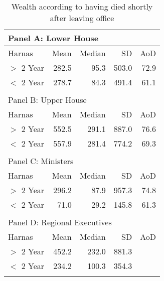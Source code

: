 \begin{table}[ht]
\centering
\begin{tabular}{lrrrr}
   
\multicolumn{5}{l}{Panel A: Lower House}\\ 
\hline
Harnas & Mean & Median & SD & AoD \\\hline

$>$ 2 Year & 282.5 & 95.3 & 503.0 & 72.9 \\ 
  $<$ 2 Year & 278.7 & 84.3 & 491.4 & 61.1 \\ 
   \hline\\ 
\multicolumn{5}{l}{Panel B: Upper House}\\ 
\hline
Harnas & Mean & Median & SD & AoD \\\hline
$>$ 2 Year & 552.5 & 291.1 & 887.0 & 76.6 \\ 
  $<$ 2 Year & 557.9 & 281.4 & 774.2 & 69.3 \\ 
   \hline\\ 
\multicolumn{5}{l}{Panel C: Ministers}\\ 
\hline
Harnas & Mean & Median & SD & AoD \\\hline
$>$ 2 Year & 296.2 & 87.9 & 957.3 & 74.8 \\ 
  $<$ 2 Year & 71.0 & 29.2 & 145.8 & 61.3 \\ 
   \hline\\ 
\multicolumn{5}{l}{Panel D: Regional Executives}\\ 
\hline
Harnas & Mean & Median & SD & AoD \\\hline
$>$ 2 Year & 452.2 & 232.0 & 881.3 &  \\ 
  $<$ 2 Year & 234.2 & 100.3 & 354.3 &  \\ 
   \hline
\multicolumn{5}{l}{}\\
\end{tabular}
\caption{Wealth according to having died shortly after leaving office} 
\label{tab:harnas}
\end{table}